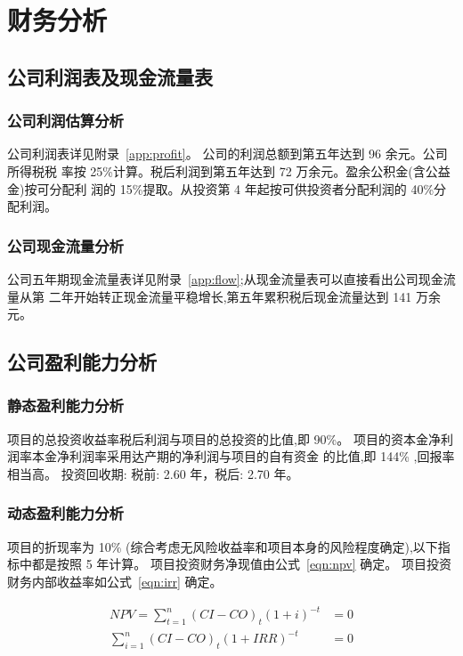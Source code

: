 \chapter{财务分析}
\section{公司利润表及现金流量表}

\subsection{公司利润估算分析}
公司利润表详见附录~\ref{app:profit}。
公司的利润总额到第五年达到 96 余元。公司所得税税
率按 25\%计算。税后利润到第五年达到 72 万余元。盈余公积金(含公益金)按可分配利
润的 15\%提取。从投资第 4 年起按可供投资者分配利润的 40\%分配利润。

\subsection{公司现金流量分析}
公司五年期现金流量表详见附录~\ref{app:flow};从现金流量表可以直接看出公司现金流量从第
二年开始转正现金流量平稳增长,第五年累积税后现金流量达到 141 万余元。

\section{公司盈利能力分析}
\subsection{静态盈利能力分析}
项目的总投资收益率税后利润与项目的总投资的比值,即 90\%。
项目的资本金净利润率本金净利润率采用达产期的净利润与项目的自有资金
的比值,即 144\% ,回报率相当高。
投资回收期: 税前: 2.60 年，税后: 2.70 年。

\subsection{动态盈利能力分析}
项目的折现率为 10\% (综合考虑无风险收益率和项目本身的风险程度确定),以下指
标中都是按照 5 年计算。
项目投资财务净现值由公式~\eqref{eqn:npv} 确定。
项目投资财务内部收益率如公式~\eqref{eqn:irr} 确定。

\begin{align}
        NPV = \sum _{t = 1}^{n} (CI - CO)_{t} (1 + i)^{-t} &= 0%
        \label{eqn:npv} \\
        \sum _{i = 1}^{n} (CI - CO)_{t} (1 + IRR)^{-t} &= 0%
        \label{eqn:irr}%
\end{align}


